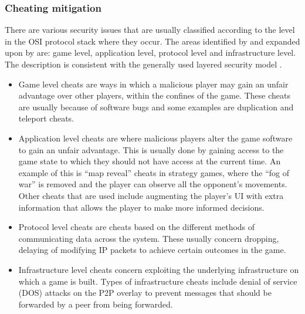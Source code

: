 \subsubsection{Cheating mitigation}
\label{key_challenges_cheating}


There are various security issues that are usually classified according to the level in the OSI protocol stack where they occur. The areas identified by \cite{cheat_proof_event_ordering} and expanded upon by \cite{cheating_taxonomy} are: game level, application level, protocol level and infrastructure level. The description is consistent with the generally used layered security model \cite{distributed_systems_security}.

\begin{itemize}
\item Game level cheats are ways in which a malicious player may gain an unfair advantage over other players, within the confines of the game. These cheats are usually because of software bugs and some examples are duplication and teleport cheats.

\item Application level cheats are where malicious players alter the game software to gain an unfair advantage. This is usually done by gaining access to the game state to which they should not have access at the current time. An example of this is ``map reveal'' cheats in strategy games, where the ``fog of war'' is removed and the player can observe all the opponent's movements. Other cheats that are used include augmenting the player's UI with extra information that allows the player to make more informed decisions.

\item Protocol level cheats are cheats based on the different methods of communicating data across the system. These usually concern dropping, delaying of modifying IP packets to achieve certain outcomes in the game.

\item Infrastructure level cheats concern exploiting the underlying infrastructure on which a game is built. Types of infrastructure cheats include denial of service (DOS) attacks on the P2P overlay to prevent messages that should be forwarded by a peer from being forwarded.
\end{itemize}

